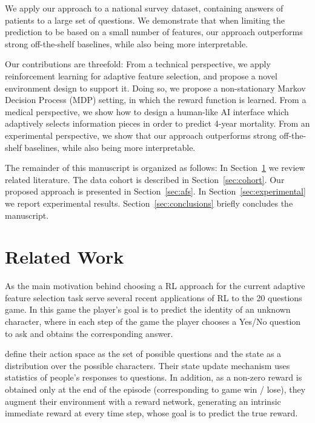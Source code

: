 \documentclass[reqno,11pt]{article}
\begin{document}
We apply our approach to a national survey dataset, containing answers of patients to a large set of questions.  We demonstrate that when limiting the prediction to be based on a small number of features, our approach outperforms strong off-the-shelf baselines, while also being more interpretable.

Our contributions are threefold:
From a technical perspective, we apply reinforcement learning for adaptive feature selection, and propose a novel environment design to support it. 
Doing so, we propose a non-stationary Markov Decision Process (MDP) setting, in which the reward function is learned. 
From a medical perspective, we show how to design a human-like AI interface which adaptively selects information pieces in order to predict 4-year mortality. 
From an experimental perspective, we show that our approach outperforms strong off-the-shelf baselines, while also being more interpretable.


The remainder of this manuscript is organized as follows: 
In Section~\ref{sec:related} we review related literature.
 The data cohort is described in Section~\ref{sec:cohort}. 
Our proposed approach is presented in Section~\ref{sec:afs}. 
In Section~\ref{sec:experimental} we report experimental results. 
Section~\ref{sec:conclusions} briefly concludes the manuscript.

\section {Related Work}\label{sec:related}

As the main motivation behind choosing a RL approach for the current adaptive feature selection task serve several recent applications of RL to the 20 questions game.
In this game the player's goal is to predict the identity of an unknown character, where in each step of the game the player chooses a Yes/No question to ask and obtains the corresponding answer.
  
\citep{hu2018playing} define their action space as the set of possible questions and the state as a distribution over the possible characters. Their state update mechanism uses statistics of people's responses to questions.
In addition, as a non-zero reward is obtained only at the end of the episode (corresponding to game win / lose), they augment their environment with a reward network, generating  an intrinsic immediate reward at every time step, whose goal is to predict the true reward. 
\end{document}
